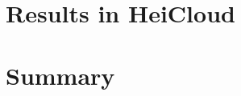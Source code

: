 \begin{table}[h]
    \centering
    \caption{}
    \begin{tabularx}{\linewidth}{l}
        \toprule
        \bottomrule
    \end{tabularx}
    \label{tab:overview-data-analysis}
\end{table}


\section{Results in HeiCloud}



\section{Summary}